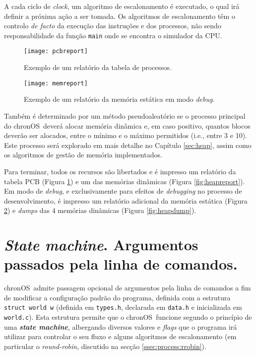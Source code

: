 \documentclass[10pt,oneside]{estiloUBI}
\newcommand{\chronOS}{\textsf{chronOS}}
\begin{document}
	A cada ciclo de \textit{clock}, um algoritmo de escalonamento é executado, o qual irá definir a próxima ação a ser tomada. Os algoritmos de escalonamento têm o controlo \textit{de facto} da execução das instruções e dos processos, não sendo responsabilidade da função \verb|main| onde se encontra o simulador da \ac{CPU}.
	
	\begin{figure}[!btp]
		\centering
		\texttt{[image: pcbreport]}
		\caption{Exemplo de um relatório da tabela de processos.}
		\label{fig:pcbreport}
	\end{figure}
	
	\begin{figure}[!btp]
		\centering
		\texttt{[image: memreport]}
		\caption{Exemplo de um relatório da memória estática em modo \textit{debug}.}
		\label{fig:memreport}
	\end{figure}

	Também é determinado por um método pseudoaleatório se o processo principal do \chronOS~deverá alocar memória dinâmica e, em caso positivo, quantos blocos deverão ser alocados, entre o mínimo e o máximo permitidos (i.e., entre 3 e 10). Este processo será explorado em mais detalhe no Capítulo \ref{sec:heap}, assim como os algoritmos de gestão de memória implementados.

	Para terminar, todos os recursos são libertados e é impresso um relatório da tabela \ac{PCB} (Figura \ref{fig:pcbreport}) e um das memórias dinâmicas (Figura \ref{fig:heapreport}). Em modo de \textit{debug}, e exclusivamente para efeitos de \textit{debugging} no processo de desenvolvimento, é impresso um relatório adicional da memória estática (Figura \ref{fig:memreport}) e \textit{dumps} das 4 memórias dinâmicas (Figura \ref{fig:heapdump}).
	
	
	\section{\textit{State machine}. Argumentos passados pela linha de comandos.}
	\label{ssec:main:argv}
	
	\chronOS~admite passagem opcional de argumentos pela linha de comandos a fim de modificar a configuração padrão do programa, definida com a estrutura \texttt{struct world w} (definida em \verb|types.h|, declarada em \verb|data.h| e inicializada em \verb|world.c|). Esta estrutura permite que o \chronOS~funcione segundo o princípio de uma \textit{\textbf{state machine}}, albergando diversos valores e \textit{flags} que o programa irá utilizar para controlar o seu fluxo e alguns algoritmos de escalonamento (em particular o \textit{round-robin}, discutido na secção \ref{ssec:process:rrobin}).
	
\end{document}
